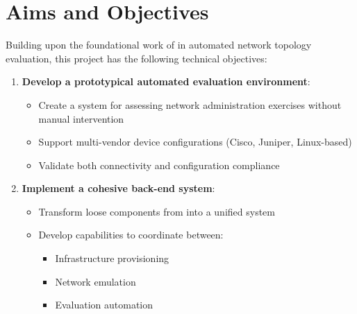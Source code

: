 \section{Aims and Objectives}

Building upon the foundational work of \citet{santos2024} in automated network topology evaluation, this project has the following technical objectives:

\begin{enumerate}
    \item \textbf{Develop a prototypical automated evaluation environment}:
    \begin{itemize}
        \item Create a system for assessing network administration exercises without manual intervention
        \item Support multi-vendor device configurations (Cisco, Juniper, Linux-based)
        \item Validate both connectivity and configuration compliance
    \end{itemize}

    \item \textbf{Implement a cohesive back-end system}:
    \begin{itemize}
        \item Transform loose components from \citet{santos2024} into a unified system
        \item Develop capabilities to coordinate between:
        \begin{itemize}
            \item Infrastructure provisioning
            \item Network emulation 
            \item Evaluation automation
        \end{itemize}
    \end{itemize}
\end{enumerate}

